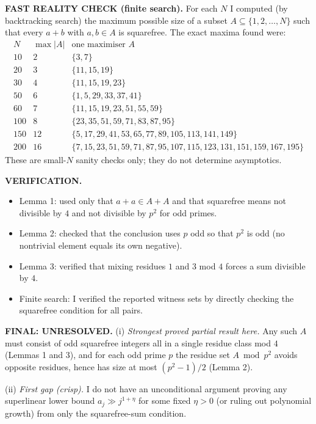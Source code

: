 \medskip
\noindent\textbf{FAST REALITY CHECK (finite search).}
For each $N$ I computed (by backtracking search) the maximum possible size of a subset $A\subseteq\{1,2,\dots,N\}$ such that every $a+b$ with $a,b\in A$ is squarefree.
The exact maxima found were:
\[
\begin{array}{c|c|l}
N & \max|A| & \text{one maximiser }A\\\hline
10 & 2 & \{3,7\}\\
20 & 3 & \{11,15,19\}\\
30 & 4 & \{11,15,19,23\}\\
50 & 6 & \{1,5,29,33,37,41\}\\
60 & 7 & \{11,15,19,23,51,55,59\}\\
100 & 8 & \{23,35,51,59,71,83,87,95\}\\
150 & 12 & \{5,17,29,41,53,65,77,89,105,113,141,149\}\\
200 & 16 & \{7,15,23,51,59,71,87,95,107,115,123,131,151,159,167,195\}
\end{array}
\]
These are small-$N$ sanity checks only; they do not determine asymptotics.

\medskip
\noindent\textbf{VERIFICATION.}
\begin{itemize}
\item Lemma 1: used only that $a+a\in A+A$ and that squarefree means not divisible by $4$ and not divisible by $p^2$ for odd primes.
\item Lemma 2: checked that the conclusion uses $p$ odd so that $p^2$ is odd (no nontrivial element equals its own negative).
\item Lemma 3: verified that mixing residues $1$ and $3$ mod $4$ forces a sum divisible by $4$.
\item Finite search: I verified the reported witness sets by directly checking the squarefree condition for all pairs.
\end{itemize}

\medskip
\noindent\textbf{FINAL: \textbf{UNRESOLVED}.}
(i) \emph{Strongest proved partial result here.} Any such $A$ must consist of odd squarefree integers all in a single residue class mod $4$ (Lemmas 1 and 3), and for each odd prime $p$ the residue set $A\bmod p^2$ avoids opposite residues, hence has size at most $(p^2-1)/2$ (Lemma 2).

(ii) \emph{First gap (crisp).} I do not have an unconditional argument proving any superlinear lower bound $a_j\gg j^{1+\eta}$ for some fixed $\eta>0$ (or ruling out polynomial growth) from only the squarefree-sum condition.

